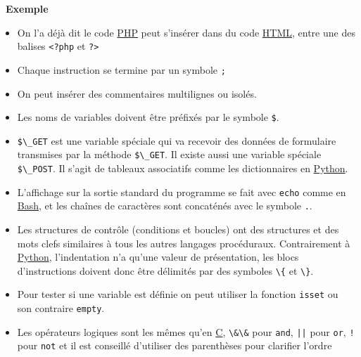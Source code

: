 \documentclass[
  11pt,
]{article}
\newcommand{\passthrough}[1]{#1}
\providecommand{\tightlist}{%
  \setlength{\itemsep}{0pt}\setlength{\parskip}{0pt}}
\newcounter{exple}
\newenvironment{exemple}[1]
{\par \medskip   \addtocounter{exple}{1} \noindent  
\begin{bclogo}[arrondi =0.1,   noborder = true, logo=\bclampe, marge=4]{~\textbf{Exemple} \textbf{\theexple} {\itshape #1} }  \par}
{
\end{bclogo}
 \par \bigskip }
\newcounter{prog}
\newcounter{logi}
\begin{document}
\begin{exemple}{}
\begin{enumerate}
  \begin{itemize}
  \tightlist
  \item
    On l'a déjà dit le code
    \href{https://developer.mozilla.org/fr/docs/Glossaire/PHP}{PHP} peut
    s'insérer dans du code
    \href{https://developer.mozilla.org/fr/docs/Glossaire/HTML}{HTML},
    entre une des balises \passthrough{\lstinline!<?php!} et
    \passthrough{\lstinline!?>!}
  \item
    Chaque instruction se termine par un symbole
    \passthrough{\lstinline!;!}
  \item
    On peut insérer des commentaires multilignes ou isolés.
  \item
    Les noms de variables doivent être préfixés par le symbole
    \passthrough{\lstinline!$!}.
  \item
    \passthrough{\lstinline!$\_GET!} est une variable spéciale qui va
    recevoir des données de formulaire transmises par la méthode
    \passthrough{\lstinline!$\_GET!}. Il existe aussi une variable
    spéciale \passthrough{\lstinline!$\_POST!}. Il s'agit de tableaux
    associatifs comme les dictionnaires en
    \href{https://docs.python.org/3.7/library/cgi.html}{Python}.
  \item
    L'affichage sur la sortie standard du programme se fait avec
    \passthrough{\lstinline!echo!} comme en
    \href{https://doc.ubuntu-fr.org/bash}{Bash}, et les chaînes de
    caractères sont concaténés avec le symbole
    \passthrough{\lstinline!.!}.
  \item
    Les structures de contrôle (conditions et boucles) ont des
    structures et des mots clefs similaires à tous les autres langages
    procéduraux. Contrairement à
    \href{https://docs.python.org/3.7/library/cgi.html}{Python},
    l'indentation n'a qu'une valeur de présentation, les blocs
    d'instructions doivent donc être délimités par des symboles
    \passthrough{\lstinline!\{!} et \passthrough{\lstinline!\}!}.
  \item
    Pour tester si une variable est définie on peut utiliser la fonction
    \passthrough{\lstinline!isset!} ou son contraire
    \passthrough{\lstinline!empty!}.
  \item
    Les opérateurs logiques sont les mêmes qu'en
    \href{https://fr.wikipedia.org/wiki/C_(langage)}{C},
    \passthrough{\lstinline!\&\&!} pour \passthrough{\lstinline!and!},
    \passthrough{\lstinline!||!} pour \passthrough{\lstinline!or!},
    \passthrough{\lstinline"!"} pour \passthrough{\lstinline!not!} et il
    est conseillé d'utiliser des parenthèses pour clarifier l'ordre

\end{itemize}
\end{enumerate}
\end{exemple}
\end{document}
